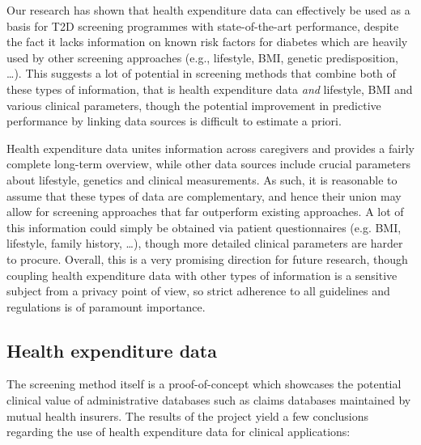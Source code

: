 Our research has shown that health expenditure data can effectively be used as a basis for T2D screening programmes with state-of-the-art performance, despite the fact it lacks information on known risk factors for diabetes which are heavily used by other screening approaches (e.g., lifestyle, BMI, genetic predisposition, \ldots). This suggests a lot of potential in screening methods that combine both of these types of information, that is health expenditure data \emph{and} lifestyle, BMI and various clinical parameters, though the potential improvement in predictive performance by linking data sources is difficult to estimate a priori. 

Health expenditure data unites information across caregivers and provides a fairly complete long-term overview, while other data sources include crucial parameters about lifestyle, genetics and clinical measurements. As such, it is reasonable to assume that these types of data are complementary, and hence their union may allow for screening approaches that far outperform existing approaches. A lot of this information could simply be obtained via patient questionnaires (e.g. BMI, lifestyle, family history, \ldots), though more detailed clinical parameters are harder to procure. Overall, this is a very promising direction for future research, though coupling health expenditure data with other types of information is a sensitive subject from a privacy point of view, so strict adherence to all guidelines and regulations is of paramount importance. 

\subsection{Health expenditure data}
The screening method itself is a proof-of-concept which showcases the potential clinical value of administrative databases such as claims databases maintained by mutual health insurers. The results of the project yield a few conclusions regarding the use of health expenditure data for clinical applications:

